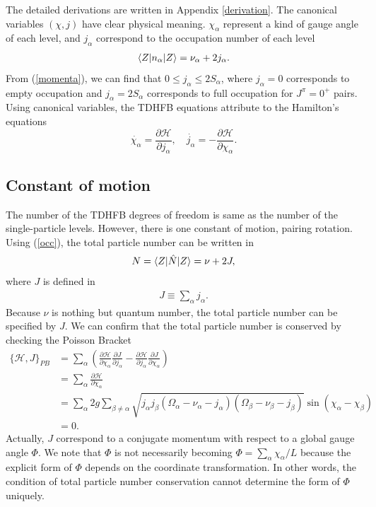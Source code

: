 \documentclass[11pt]{book} %
\begin{document}
The detailed derivations are written in Appendix \ref{derivation}. The canonical variables $(\chi,j)$ have clear physical meaning. $\chi_{\alpha}$ represent a kind of gauge angle of each level, and $j_{\alpha}$ correspond to the occupation number of each level
\begin{align}
  \braket{Z|n_{\alpha}|Z} = \nu_{\alpha} + 2j_{\alpha} .
  \label{occ}
\end{align}
From (\ref{momenta}), we can find that $0\le j_{\alpha}\le 2S_{\alpha}$, where $j_{\alpha}=0$ corresponds to empty occupation and $j_{\alpha}=2S_{\alpha}$ corresponds to full occupation for $J^{\pi}=0^+$ pairs.
Using canonical variables, the TDHFB equations attribute to the Hamilton's equations
\begin{equation}
	\dot{\chi_{\alpha}} = \frac{\partial\mathcal{H}}{\partial j_{\alpha}}, \quad
	\dot{j_{\alpha}} = -\frac{\partial\mathcal{H}}{\partial \chi_{\alpha}} .
\end{equation}

\subsection{Constant of motion}
\label{constant}
The number of the TDHFB degrees of freedom is same as the number of the single-particle levels. However, there is one constant of motion, pairing rotation. Using (\ref{occ}), the total particle number can be written in
\begin{align}
	N = \braket{Z|\hat{N}|Z} = \nu + 2J ,
\end{align}
where $J$ is defined in
\begin{align}
	J \equiv \sum_{\alpha} j_{\alpha} .
\end{align}
Because $\nu$ is nothing but quantum number, the total particle number can be specified by $J$.
We can confirm that the total particle number is conserved by checking the Poisson Bracket
\begin{align}
	\{\mathcal{H},J\}_{PB} &= \sum_{\alpha} \left(
	\frac{\partial\mathcal{H}}{\partial\chi_{\alpha}}\frac{\partial J}{\partial j_{\alpha}}
	- \frac{\partial\mathcal{H}}{\partial j_{\alpha}}\frac{\partial J}{\partial \chi_{\alpha}} \right) \nonumber \\
	&= \sum_{\alpha} \frac{\partial\mathcal{H}}{\partial\chi_{\alpha}} \nonumber \\
	&= \sum_{\alpha} 2g \sum_{\beta\neq \alpha} \sqrt{j_{\alpha}j_{\beta}(\Omega_{\alpha}-\nu_{\alpha}-j_{\alpha})(\Omega_{\beta}-\nu_{\beta}-j_{\beta})}\sin{(\chi_{\alpha}-\chi_{\beta})} \nonumber \\
	&= 0 .
\end{align} 
Actually, $J$ correspond to a conjugate momentum with respect to a global gauge angle $\Phi$. We note that $\Phi$ is not necessarily becoming $\Phi=\sum_{\alpha} \chi_{\alpha}/L$ because the explicit form of $\Phi$ depends on the coordinate transformation. In other words, the condition of total particle number conservation cannot determine the form of $\Phi$ uniquely.
\end{document}

